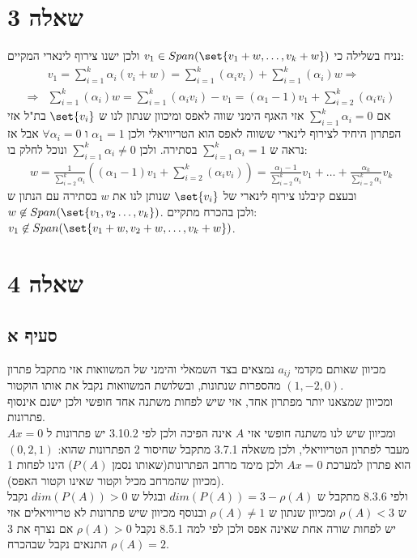 \documentclass{article}
\DeclarePairedDelimiter\set\{\}
\begin{document}
	\pagebreak
	\section*{שאלה 3}
	נניח בשלילה כי $v_1 \in Span(\set{v_1+w, \dots, v_k + w})$ ולכן ישנו צירוף לינארי המקיים:
	\begin{align*}
		&v_1 = \sum_{i=1}^k \alpha_i (v_i + w) =
		\sum_{i=1}^k (\alpha_i v_i) + \sum_{i=1}^k (\alpha_i)w \Rightarrow \\
		\Rightarrow
		&\sum_{i=1}^k (\alpha_i)w  = \sum_{i=1}^k (\alpha_i v_i) - v_1 =
		(\alpha_1 - 1)v_1 + \sum_{i=2}^k (\alpha_i v_i)
	\end{align*}
	אם $\sum_{i=1}^k \alpha_i = 0$ אזי האגף הימני שווה לאפס ומיכוון שנתון לנו ש $\set{v_i}$ בת"ל אזי הפתרון היחיד לצירוף לינארי ששווה לאפס הוא הטריוויאלי ולכן $\alpha_1 = 1$ ו $\forall \alpha_i=0$ אבל אז נראה ש $\sum_{i=1}^k \alpha_i =1$ בסתירה. ולכן $\sum_{i=1}^k \alpha_i \neq 0$ ונוכל לחלק בו:
	\begin{align*}
		w = \frac{1}{\sum_{i=2}^k \alpha_i}((\alpha_1 - 1)v_1 + \sum_{i=2}^k (\alpha_i v_i)) =
		\frac{\alpha_1 - 1}{\sum_{i=2}^k \alpha_i}v_1 + \dots + \frac{\alpha_k}{\sum_{i=2}^k \alpha_i}v_k
	\end{align*}
	ובעצם קיבלנו צירוף לינארי של $\set{v_i}$ שנותן לנו את $w$ בסתירה עם הנתון ש  \\ $w \not\in Span(\set{v_1, v_2 \dots, v_k})$.
	ולכן בהכרח מתקיים: \\ $v_1 \not\in Span(\set{v_1 + w, v_2 + w, \dots, v_k + w})$.


	\pagebreak
	\section*{שאלה 4}
	\subsection*{סעיף א}
	מכיוון שאותם מקדמי $a_{ij}$ נמצאים בצד השמאלי והימני של המשוואות אזי מתקבל פתרון מהספרות שנתונות, ובשלושת המשוואות נקבל את אותו הוקטור $(1, -2, 0)$. \\
	ומכיוון שמצאנו יותר מפתרון אחד, אזי שיש לפחות משתנה אחד חופשי ולכן ישנם אינסוף פתרונות. \\
	ומכיוון שיש לנו משתנה חופשי אזי $A$ אינה הפיכה ולכן לפי 3.10.2 יש פתרונות ל $Ax=0$ מעבר לפתרון הטריוויאלי,
	ולכן משאלה 3.7.1 מתקבל שחיסור 2 הפתרונות שהוא: $(0,2,1)$ הוא פתרון למערכת $Ax=0$ ולכן מימד מרחב הפתרונות(שאותו נסמן $P(A)$) הינו לפחות 1 (מכיוון שהמרחב מכיל וקטור שאינו וקטור האפס). \\
	ולפי 8.3.6 מתקבל ש $dim(P(A)) = 3 - \rho(A)$ ובגלל ש $dim(P(A)) > 0$ נקבל ש $\rho(A) < 3$ ומכיוון שנתון ש $\rho(A) \neq 1$ ובנוסף מכיוון שיש פתרונות לא טריוויאלים אזי יש לפחות שורה אחת שאינה אפס ולכן לפי למה 8.5.1 נקבל $\rho(A) > 0$
	אם נצרף את 3 התנאים נקבל שבהכרח $\rho(A)=2$.
\end{document}
